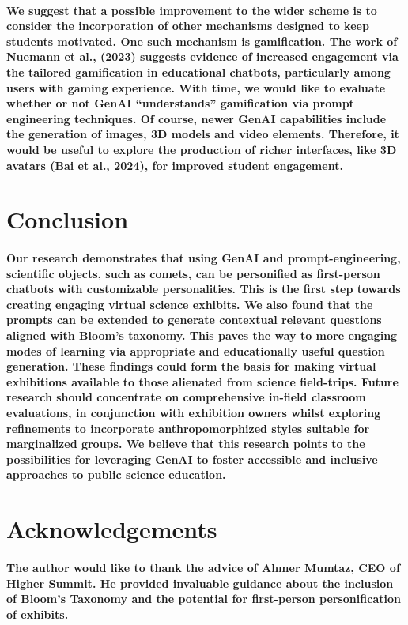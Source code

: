 \documentclass{article}
\begin{document}
\paragraph{We suggest that a possible improvement to the wider scheme is to consider the incorporation of other mechanisms designed to keep students motivated. One such mechanism is gamification. The work of Nuemann et al., (2023) suggests evidence of increased engagement via the tailored gamification in educational chatbots, particularly among users with gaming experience. With time, we would like to evaluate whether or not GenAI “understands” gamification via prompt engineering techniques. Of course, newer GenAI capabilities include the generation of images, 3D models and video elements. Therefore, it would be useful to explore the production of richer interfaces, like 3D avatars (Bai et al., 2024), for improved student engagement.}

\section*{Conclusion}

\paragraph{Our research demonstrates that using GenAI and prompt-engineering, scientific objects, such as comets, can be personified as first-person chatbots with customizable personalities. This is the first step towards creating engaging virtual science exhibits. We also found that the prompts can be extended to generate contextual relevant questions aligned with Bloom’s taxonomy. This paves the way to more engaging modes of learning via appropriate and educationally useful question generation. These findings could form the basis for making virtual exhibitions available to those alienated from science field-trips. Future research should concentrate on comprehensive in-field classroom evaluations, in conjunction with exhibition owners whilst exploring refinements to incorporate anthropomorphized styles suitable for marginalized groups. We believe that this research points to the possibilities for leveraging GenAI to foster accessible and inclusive approaches to public science education.}

\section*{Acknowledgements}
\paragraph{The author would like to thank the advice of Ahmer Mumtaz, CEO of Higher Summit. He provided invaluable guidance about the inclusion of Bloom's Taxonomy and the potential for first-person personification of exhibits.}
\end{document}
